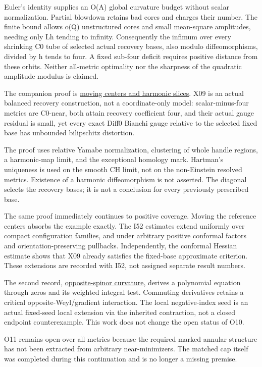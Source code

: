 \documentclass[
  10pt,
]{article}
\begin{document}
Euler's identity supplies an O(A) global curvature budget without scalar
normalization. Partial blowdown retains bad cores and charges their
number. The finite bound allows o(Q) unstructured cores and small
mean-square amplitudes, needing only Lh tending to infinity.
Consequently the infimum over every shrinking C0 tube of selected actual
recovery bases, also modulo diffeomorphisms, divided by h tends to four.
A fixed sub-four deficit requires positive distance from these orbits.
Neither all-metric optimality nor the sharpness of the quadratic
amplitude modulus is claimed.

The companion proof is
\href{../continuation/20260928_marked_centers_and_harmonic_slices.md}{moving
centers and harmonic slices}. X09 is an actual balanced recovery
construction, not a coordinate-only model: scalar-minus-four metrics are
C0-near, both attain recovery coefficient four, and their actual gauge
residual is small, yet every exact Diff0 Bianchi gauge relative to the
selected fixed base has unbounded bilipschitz distortion.

The proof uses relative Yamabe normalization, clustering of whole handle
regions, a harmonic-map limit, and the exceptional homology mark.
Hartman's uniqueness is used on the smooth CH limit, not on the
non-Einstein resolved metrics. Existence of a harmonic diffeomorphism is
not asserted. The diagonal selects the recovery bases; it is not a
conclusion for every previously prescribed base.

The same proof immediately continues to positive coverage. Moving the
reference centers absorbs the example exactly. The I52 estimates extend
uniformly over compact configuration families, and under arbitrary
positive conformal factors and orientation-preserving pullbacks.
Independently, the conformal Hessian estimate shows that X09 already
satisfies the fixed-base approximate criterion. These extensions are
recorded with I52, not assigned separate result numbers.

The second record,
\href{../continuation/20260928_zero_endpoint_phase_curvature.md}{opposite-spinor
curvature}, derives a polynomial equation through zeros and its weighted
integral test. Commuting derivatives retains a critical
opposite-Weyl/gradient interaction. The local negative-index seed is an
actual fixed-seed local extension via the inherited contraction, not a
closed endpoint counterexample. This work does not change the open
status of O10.

O11 remains open over all metrics because the required marked annular
structure has not been extracted from arbitrary near-minimizers. The
matched cap itself was completed during this continuation and is no
longer a missing premise.
\end{document}
